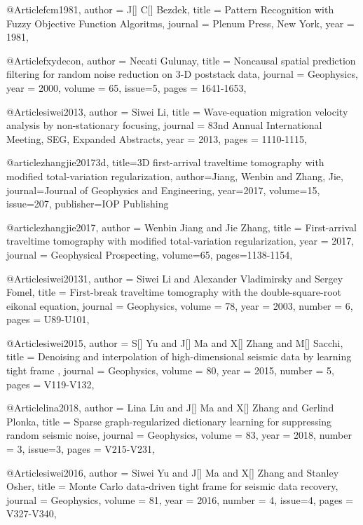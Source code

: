 @Article{fcm1981,
  author =	 { J[] C[] Bezdek},
  title =	 {Pattern Recognition with Fuzzy Objective Function Algoritms},
  journal =	 {Plenum Press, New York},
  year =	 1981,
}

@Article{fxydecon,
  author =	 {Necati Gulunay},
  title =	 {Noncausal spatial prediction filtering for random noise reduction on 3-D poststack data},
  journal =	 {Geophysics},
  year =	 2000,
  volume = 65,
  issue={5}, 
  pages =	 {1641-1653},
}	



@Article{siwei2013,
  author = 	 {Siwei Li},
  title = 	 {Wave-equation migration velocity analysis by non-stationary focusing},
  journal = 	 {83nd Annual International Meeting, SEG, Expanded Abstracts},
  year = 	 2013,
  pages =	 {1110-1115},
}



@article{zhangjie20173d,
  title={3{D} first-arrival traveltime tomography with modified total-variation regularization},
  author={Jiang, Wenbin and Zhang, Jie},
  journal={Journal of Geophysics and Engineering},
  year={2017},
  volume=15,
  issue=207,
  publisher={IOP Publishing}
}

@article{zhangjie2017,
  author =	 {Wenbin Jiang and Jie Zhang},
  title =	 {First-arrival traveltime tomography with modified total-variation
regularization},
  year =	 2017,
  journal =	{Geophysical Prospecting},
  volume={65},
 pages=1138-1154,
}



@Article{siwei20131,
  author =	 { Siwei Li and Alexander Vladimirsky and Sergey Fomel},
  title =	 { First-break traveltime tomography with the
double-square-root eikonal equation},
  journal =	 {Geophysics},
  volume =	 78,
  year =	 2003,
  number =	 6,
  pages =	 {U89-U101},
}

@Article{siwei2015,
  author =	 { S[] Yu and J[] Ma and X[] Zhang and M[] Sacchi},
  title =	 { Denoising and interpolation of high-dimensional seismic data by learning tight frame },
  journal =	 {Geophysics},
  volume =	 80,
  year =	 2015,
  number =	 5,
  pages =	 {V119-V132},
}


@Article{lina2018,
  author =	 { Lina Liu and J[] Ma and X[] Zhang and Gerlind Plonka},
  title =	 { Sparse graph-regularized dictionary learning for suppressing random seismic noise},
  journal =	 {Geophysics},
  volume =	 83,
  year =	 2018,
  number =	 3,
  issue=3,
  pages =	 {V215-V231},
}


@Article{siwei2016,
  author =	 { Siwei Yu and J[] Ma and X[] Zhang and Stanley Osher},
  title =	 { Monte Carlo data-driven tight frame for seismic data recovery},
  journal =	 {Geophysics},
  volume =	 81,
  year =	 2016,
  number =	 4,
  issue=4,
  pages =	 {V327-V340},
}



